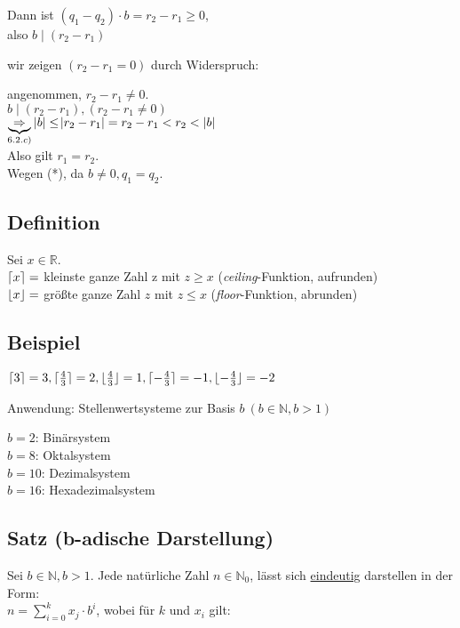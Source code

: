 \documentclass[a4paper, 12pt, twoside] {article}
\DeclarePairedDelimiter\ceil{\lceil}{\rceil}
\DeclarePairedDelimiter\floor{\lfloor}{\rfloor}
\begin{document}
\begin{itemize}
Dann ist $(q_1 - q_2)  \cdot  b = r_2 - r_1 \geq 0$, \\ %
also $b \mid (r_2-r_1)$

wir zeigen $(r_2-r_1 = 0)$ durch Widerspruch:

angenommen, $r_2-r_1 \neq 0$. \\
$b \mid (r_2-r_1), (r_2-r_1 \neq 0)$ \\
$\underbrace{\Rightarrow}_{6.2.c)} |b| \leq \abs{r_2 - r_1} = r_2 - r_1  < r_2 < |b|$ \\
Also gilt $r_1 = r_2$. \\
Wegen (*), da $b \neq 0, q_1=q_2$. %

\end{itemize}

\subsection[Definition (Gaußklammer / Ab- und Aufrundungsfunktion)]{Definition} %
Sei $x \in \mathbb{R}$. \\
$\ceil{x} = $ kleinste ganze Zahl z mit $z \geq x$
(\textit{ceiling}-Funktion, aufrunden) \\
$\floor{x} = $ größte ganze Zahl $z$ mit $z \leq x$ 
(\textit{floor}-Funktion, abrunden)

\subsection{Beispiel} %
$\ceil{3} = 3, \ceil{\frac{4}{3}} = 2,  \floor{\frac{4}{3}} = 1, \ceil{-\frac{4}{3}} = -1, \floor {-\frac{4}{3}} = -2$

Anwendung: Stellenwertsysteme zur Basis $b\ (b \in \mathbb{N}, b > 1)$

$b = 2$: Binärsystem \\
$b = 8$: Oktalsystem \\
$b = 10$: Dezimalsystem \\
$b = 16$: Hexadezimalsystem

\subsection{Satz (b-adische Darstellung)} %

Sei $b \in \mathbb{N}, b > 1$.
Jede natürliche Zahl $n \in \mathbb{N}_0$, lässt sich \underline{eindeutig} darstellen in der Form: \\
$n = \displaystyle\sum_{i=0}^{k} x_j  \cdot  b^i$,
wobei für $k$ und $x_i$ gilt:
\end{document}

